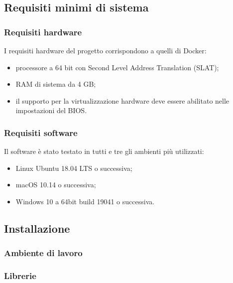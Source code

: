 \subsection{Requisiti minimi di sistema}

	\subsubsection{Requisiti hardware}
	I requisiti hardware del progetto corrispondono a quelli di Docker:
	\begin{itemize}
		\item processore a 64 bit con Second Level Address Translation (SLAT);
		\item RAM di sistema da 4 GB;
		\item il supporto per la virtualizzazione hardware deve essere abilitato nelle impostazioni del BIOS.
	\end{itemize}  
	
	\subsubsection{Requisiti software}
	Il software è stato testato in tutti e tre gli ambienti più utilizzati:
	\begin{itemize}
		\item Linux Ubuntu 18.04 LTS o successiva; 
		\item macOS 10.14 o successiva;
		\item Windows 10 a 64bit build 19041 o successiva.
	\end{itemize}  
	
\subsection{Installazione}

	\subsubsection{Ambiente di lavoro}

	\subsubsection{Librerie}

